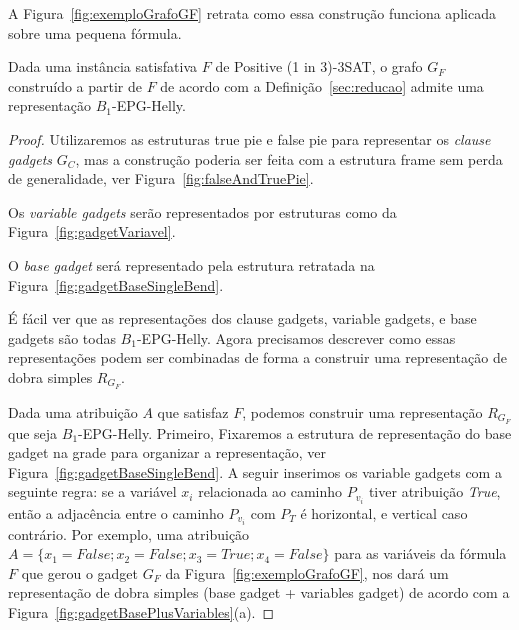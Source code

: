 A Figura~\ref{fig:exemploGrafoGF} retrata como essa construção funciona aplicada sobre uma pequena fórmula. %





\begin{lema}\label{lem:ida}
Dada uma instância satisfativa $F$ de {\sc Positive (1 in 3)-3SAT}, o grafo  $G_F$ construído a partir de $F$ de acordo com a Definição~\ref{sec:reducao} admite uma representação $B_{1}$-EPG-Helly.
\end{lema}


\begin{proof}

Utilizaremos as estruturas  true pie e false pie para representar os  \textit{clause gadgets} $ G_C$, mas a construção poderia ser feita com a estrutura frame sem perda de generalidade, ver Figura~\ref{fig:falseAndTruePie}.  




Os \textit{variable gadgets} serão representados por estruturas como da Figura~\ref{fig:gadgetVariavel}.




O \textit{base gadget} será representado pela estrutura retratada na  Figura~\ref{fig:gadgetBaseSingleBend}.



É fácil ver que as representações dos clause gadgets, variable gadgets, e base gadgets são todas  $B_1$-EPG-Helly. Agora precisamos descrever como essas representações podem ser combinadas de forma a construir uma representação  de dobra simples $R_{G_F}$.

Dada uma atribuição  $A$ que satisfaz  $F$, podemos construir uma representação $R_{G_F}$ que seja  $B_{1}$-EPG-Helly. Primeiro, Fixaremos a estrutura de representação do base gadget na grade para organizar a representação, ver Figura~\ref{fig:gadgetBaseSingleBend}. A seguir inserimos os  variable gadgets com a seguinte regra: se a variável $x_i$ relacionada ao caminho   $P_{v_i}$ tiver atribuição  \textit{True}, então a adjacência entre o caminho $P_{v_i}$ com $P_{T}$ é horizontal, e vertical caso contrário. Por exemplo, uma atribuição  $A=\{x_1=False; x_2=False;x_3=True; x_4=False\}$  para as variáveis da fórmula  $F$ que gerou o gadget $G_F$ da Figura~\ref{fig:exemploGrafoGF}, nos dará um representação de dobra simples (base gadget + variables gadget) de acordo com a  Figura~\ref{fig:gadgetBasePlusVariables}(a). 


\end{proof}
